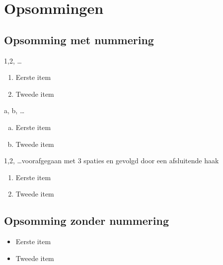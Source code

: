 \chapter{Opsommingen}
\label{opsomming}

\section{Opsomming met nummering}

\blindtext

1,2, \ldots

\begin{enumerate}
  \item Eerste item
  \item Tweede item
\end{enumerate}

\blindtext

a, b, \ldots

\begin{enumerate}[a)]
  \item Eerste item
  \item Tweede item
\end{enumerate}

\blindtext

1,2, \ldots voorafgegaan met 3 spaties en gevolgd door een afsluitende haak   

\begin{enumerate}[~~~1)]
  \item Eerste item
  \item Tweede item
\end{enumerate}

\blindtext

\section{Opsomming zonder nummering}

\blindtext

\begin{itemize}
  \item Eerste item
  \item Tweede item
\end{itemize}

\blindtext
